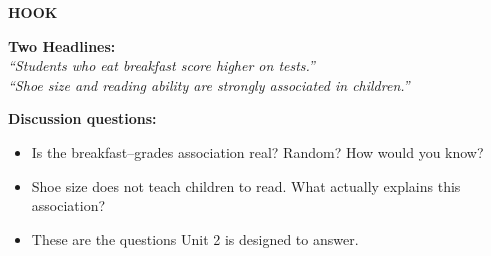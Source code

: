\documentclass[aspectratio=169, 11pt]{beamer}
\begin{document}
{
\begin{frame}[t, plain]
  \vspace{0.45cm}\par
  \hspace{0.55cm}%
  \begin{minipage}{0.9\textwidth}

    {\color{white}\bfseries\footnotesize\MakeUppercase{Hook}}\par\medskip

    {\color{white}\large\bfseries Two Headlines:}\\[0.3cm]
    {\color{skymid}\itshape
      ``Students who eat breakfast score higher on tests.''}\\[0.2cm]
    {\color{skymid}\itshape
      ``Shoe size and reading ability are strongly associated in children.''}

    \vspace{0.5cm}
    {\color{white}\bfseries Discussion questions:}\par\smallskip
    \begin{itemize}
      \setlength{\itemsep}{0.4em}\setlength{\topsep}{0.1em}
      \item {\color{white}Is the breakfast--grades association real? Random? How would you know?}
      \item {\color{white}Shoe size does not teach children to read.
        What actually explains this association?}
      \item {\color{white}These are the questions Unit 2 is designed to answer.}
    \end{itemize}

  \end{minipage}
\end{frame}
}
\end{document}

